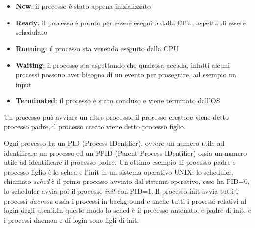 \documentclass{article}
\begin{document}
        \begin{itemize}
            \item \textbf{New}:
                il processo è stato appena inizializzato
            \item \textbf{Ready}:
                il processo è pronto per essere eseguito dalla CPU, aspetta di essere schedulato
            \item \textbf{Running}:
                il processo sta venendo eseguito dalla CPU
            \item \textbf{Waiting}:
                il processo sta aspettando che qualcosa accada, infatti alcuni processi possono
                aver bisogno di un evento per proseguire, ad esempio un input
            \item \textbf{Terminated}:
                il processo è stato concluso e viene terminato dall'OS
        \end{itemize}
        \begin{tcolorbox}[colback= green!10!white, colframe=green!40!black, title= Processo padre e processo figlio]
            Un processo può avviare un altro processo, il processo creatore viene detto processo padre, il processo creato viene detto processo figlio.
        \end{tcolorbox}
        Ogni processo ha un PID (Process IDentifier), ovvero un numero utile ad identificare un processo ed un PPID (Parent Process IDentifier) ossia un numero utile ad identificare il processo padre. Un ottimo esempio di processo padre e processo figlio è lo sched e l'init in un sistema operativo UNIX: lo scheduler, chiamato \textit{sched} è il primo processo avviato dal sistema operativo, esso ha PID=0, lo scheduler avvia poi il processo \textit{init} con PID=1. Il processo init avvia tutti i processi \textit{daemon} ossia i processi in background e anche tutti i processi relativi al login degli utenti.In questo modo lo sched è il processo antenato, e padre di init, e i processi daemon e di login sono figli di init.
\end{document}
